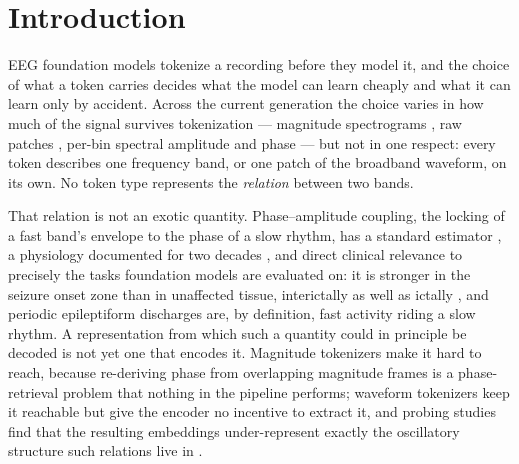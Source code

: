 \section{Introduction}
\label{sec:intro}

EEG foundation models tokenize a recording before they model it, and the
choice of what a token carries decides what the model can learn cheaply and
what it can learn only by accident. Across the current generation the
choice varies in how much of the signal survives tokenization --- magnitude
spectrograms \citep{yang2023biot,pradeepkumar2026tfm}, raw patches
\citep{wang2025cbramod,wang2024eegpt}, per-bin spectral amplitude and phase
\citep{jiang2024labram} --- but not in one respect: every token describes
one frequency band, or one patch of the broadband waveform, on its own. No
token type represents the \emph{relation} between two bands.

That relation is not an exotic quantity. Phase--amplitude coupling, the
locking of a fast band's envelope to the phase of a slow rhythm, has a
standard estimator \citep{tort2010measuring}, a physiology documented for
two decades \citep{canolty2006high,canolty2010functional}, and direct
clinical relevance to precisely the tasks foundation models are evaluated
on: it is stronger in the seizure onset zone than in unaffected tissue,
interictally as well as ictally \citep{amiri2016phase}, and periodic
epileptiform discharges are, by definition, fast activity riding a slow
rhythm. A representation from which such a quantity could in principle be
decoded is not yet one that encodes it. Magnitude tokenizers make it hard
to reach, because re-deriving phase from overlapping magnitude frames is a
phase-retrieval problem \citep{griffin1984signal} that nothing in the
pipeline performs; waveform tokenizers keep it reachable but give the
encoder no incentive to extract it, and probing studies find that the
resulting embeddings under-represent exactly the oscillatory structure
such relations live in \citep{kommineni2026aperiodic}.

